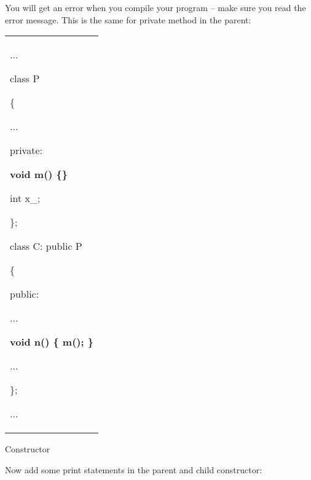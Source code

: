 \documentclass[
]{article}
\begin{document}
You will get an error when you compile your program -- make sure you
read the error message. This is the same for private method in the
parent:

\begin{longtable}[]{@{}
  >{\raggedright\arraybackslash}p{}@{}}
\toprule\noalign{}
 \\
\midrule\noalign{}
\endhead
\bottomrule\noalign{}
\endlastfoot
...

class P

\{

...

private:

\textbf{void m() \{\}}

int x\_;

\};

class C: public P

\{

public:

...

\textbf{void n() \{ m(); \}}

...

\};

... \\
\end{longtable}

Constructor

Now add some print statements in the parent and child constructor:
\end{document}
